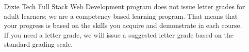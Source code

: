 Dixie Tech Full Stack Web Development program does not issue letter grades for adult learners; we are
a competency based learning program. That means that your progress is based on the skills you acquire
and demonstrate in each course. If you need a letter grade, we will issue a suggested letter grade based
on the standard grading scale.
